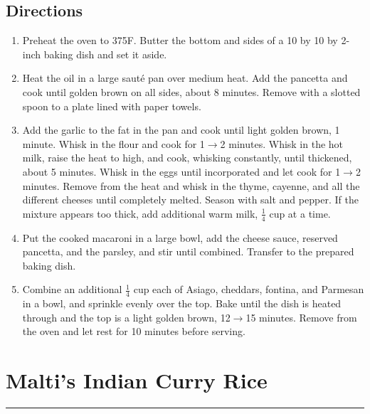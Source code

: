\documentclass[12pt]{article}
\def \hzline{\noindent \rule[0mm]{\textwidth}{1pt}}
\begin{document}
\subsection*{Directions}
\begin{enumerate}
 \item Preheat the oven to 375F. Butter the bottom and sides of a 10 by 10 by 2-inch baking dish and set it aside.

\item Heat the oil in a large saut\'e pan over medium heat. Add the pancetta and cook until golden brown on all sides, about 8 minutes. Remove with a slotted spoon to a plate lined with paper towels.

\item Add the garlic to the fat in the pan and cook until light golden brown, 1 minute. Whisk in the flour and cook for 1$\to$2 minutes. Whisk in the hot milk, raise the heat to high, and cook, whisking constantly, until thickened, about 5 minutes. Whisk in the eggs until incorporated and let cook for 1$\to$2 minutes. Remove from the heat and whisk in the thyme, cayenne, and all the different cheeses until completely melted. Season with salt and pepper. If the mixture appears too thick, add additional warm milk, $\frac{1}{4}$ cup at a time.

\item Put the cooked macaroni in a large bowl, add the cheese sauce, reserved pancetta, and the parsley, and stir until combined. Transfer to the prepared baking dish.

\item Combine an additional $\frac{1}{4}$ cup each of Asiago, cheddars, fontina, and Parmesan in a bowl, and sprinkle evenly over the top. Bake until the dish is heated through and the top is a light golden brown, 12$\to$15 minutes. Remove from the oven and let rest for 10 minutes before serving.
\end{enumerate}



\newpage
\section*{Malti's Indian Curry Rice} \hzline \\
\end{document}
